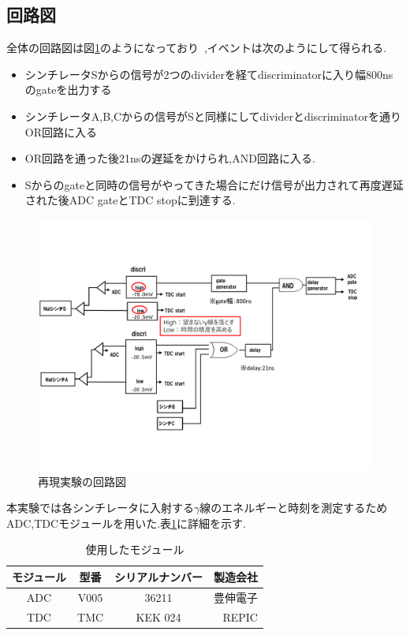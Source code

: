 \subsection{回路図}
全体の回路図は図\ref{fig:circuit2015}のようになっており~\cite{卒業論文2015},イベントは次のようにして得られる.
\begin{itemize}
		\item シンチレータSからの信号が2つのdividerを経てdiscriminatorに入り幅800nsのgateを出力する
		\item シンチレータA,B,Cからの信号がSと同様にしてdividerとdiscriminatorを通りOR回路に入る
		\item OR回路を通った後21nsの遅延をかけられ,AND回路に入る.
		\item Sからのgateと同時の信号がやってきた場合にだけ信号が出力されて再度遅延された後ADC gateとTDC stopに到達する.
\end{itemize}
\begin{figure}[htbp]
	\centering
		\includegraphics[width=15cm]{fig/isb/circuit.pdf}
		\caption{再現実験の回路図}
		\label{fig:circuit2015}
\end{figure}

本実験では各シンチレータに入射する$\gamma$線のエネルギーと時刻を測定するためADC,TDCモジュールを用いた.表\ref{module2016}に詳細を示す.
\begin{table}[H]
	\centering
	\begin{tabular}{|c|c|c|r|} \hline
		モジュール & 型番 & シリアルナンバー & 製造会社 \\ \hline \hline
		ADC & V005 & 36211 & 豊伸電子 \\ \hline
		TDC & TMC & KEK 024  & REPIC \\ \hline
	\end{tabular}
	\caption{使用したモジュール}
	\label{module2016}
\end{table}

